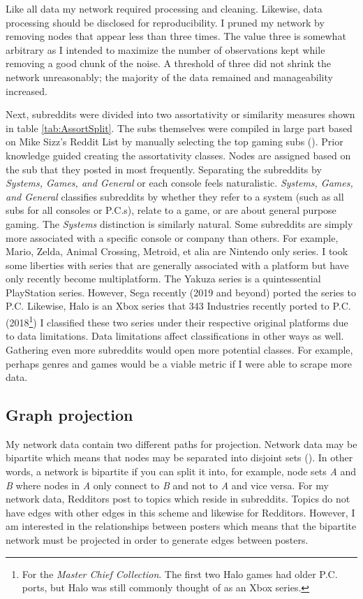 \documentclass[12pt, a4paper]{article}
\begin{document}
Like all data my network required processing and cleaning. Likewise, data processing should be disclosed for reproducibility. I pruned my network by removing nodes that appear less than three times. The value three is somewhat arbitrary as I intended to maximize the number of observations kept while removing a good chunk of the noise. A threshold of three did not shrink the network unreasonably; the majority of the data remained and manageability increased.

Next, subreddits were divided into two assortativity or similarity measures shown in table \ref{tab:AssortSplit}. The subs themselves were compiled in large part based on Mike Sizz's Reddit List by manually selecting the top gaming subs (\cite{redditlist}). Prior knowledge guided creating the assortativity classes. Nodes are assigned based on the sub that they posted in most frequently. Separating the subreddits by \textit{Systems, Games, and General} or each console feels naturalistic. \textit{Systems, Games, and General} classifies subreddits by whether they refer to a system (such as all subs for all consoles or P.C.s), relate to a game, or are about general purpose gaming. The \textit{Systems} distinction is similarly natural. Some subreddits are simply more associated with a specific console or company than others. For example, Mario, Zelda, Animal Crossing, Metroid, et alia are Nintendo only series. I took some liberties with series that are generally associated with a platform but have only recently become multiplatform. The Yakuza series is a quintessential PlayStation series. However, Sega recently (2019 and beyond) ported the series to P.C. Likewise, Halo is an Xbox series that 343 Industries recently ported to P.C. (2018\footnote{For the \textit{Master Chief Collection}. The first two Halo games had older P.C. ports, but Halo was still commonly thought of as an Xbox series.}) I classified these two series under their respective original platforms due to data limitations. Data limitations affect classifications in other ways as well. Gathering even more subreddits would open more potential classes. For example, perhaps genres and games would be a viable metric if I were able to scrape more data.

\subsection{Graph projection}

My network data contain two different paths for projection. Network data may be bipartite which means that nodes may be separated into disjoint sets (\cite{banerjee2017}). In other words, a network is bipartite if you can split it into, for example, node sets \textit{A} and \textit{B} where nodes in \textit{A} only connect to \textit{B} and not to \textit{A} and vice versa. For my network data, Redditors post to topics which reside in subreddits. Topics do not have edges with other edges in this scheme and likewise for Redditors. However, I am interested in the relationships between posters which means that the bipartite network must be projected in order to generate edges between posters.
\end{document}
